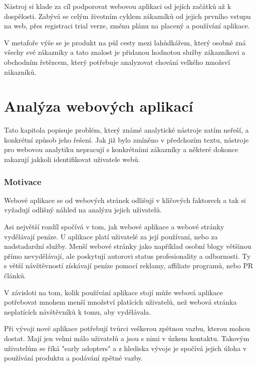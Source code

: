 \documentclass[bc,female,java,dept456]{diploma}						%
\begin{document}
Nástroj si klade za cíl podporovat webovou aplikaci od jejích začátků až k dospělosti. Zabývá se celým životním cyklem zákazníků od jejich prvního vstupu na web, přes registraci trial verze, změnu plánu na placený a používání aplikace.

V metafoře výše se je produkt na půl cesty mezi lahůdkářem, který osobně zná všechy své zákazníky a tato znalost je přidanou hodnotou služby zákazníkovi a obchodním řetězcem, který potřebuje analyzovat chování velkého množsví zákazníků.









\section{Analýza webových aplikací}

Tato kapitola popisuje problém, který známé analytické nástroje zatím neřeší, a konkrétní způsob jeho řešení. Jak již bylo zmíněno v předchozím textu, nástroje pro webovou analytiku nepracují s konkrétními zákazníky a některé dokonce zakazují jakkoli identifikovat uživatele webů.



\subsubsection{Motivace}

Webové aplikace se od webových stránek odlišují v klíčových faktorech a tak si vyžadují odlišný náhled na analýzu jejich uživatelů. 

Asi největší rozdíl spočívá v tom, jak webové aplikace a webové stránky vydělávají peníze. U aplikace platí uživatelé za její používaní, nebo za nadstadardní služby. Menší webové stránky jako například osobní blogy většinou přímo nevydělávají, ale poskytují autorovi status profesionality a odbornosti. Ty s větší návštěvností získávají peníze pomocí reklamy, affiliate programů, nebo PR článků.

V závisloti na tom, kolik používání aplikace stojí může webová aplikace potřebovat mnohem menší množství platících uživatelů, než webová stránka neplatících návštěvníků k tomu, aby vydělávala. 

Při vývoji nové aplikace potřebují tvůrci veškerou zpětnou vazbu, kterou mohou dostat. Mají jen velmi málo uživatelů a jsou s nimi v úzkem kontaktu. Takovým uživatelům se říká "early adopters" a z hlediska vývoje je spočívá jejich úloha v používání produktu a podávání zpětné vazby. 
\end{document}
